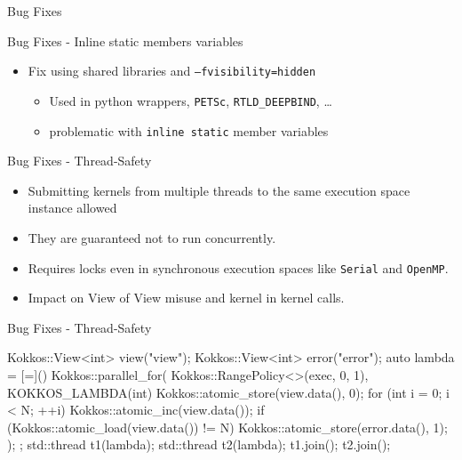 
\begin{frame}[fragile]

  {\Huge Bug Fixes}

    \vspace{10pt}

\end{frame}



\begin{frame}[fragile]{Bug Fixes - Inline static members variables}

\begin{itemize}
\item Fix using shared libraries and \texttt{--fvisibility=hidden}
  \begin{itemize}
  \item Used in python wrappers, \texttt{PETSc}, \texttt{RTLD\_DEEPBIND}, \dots
  \item problematic with \texttt{inline static} member variables
  \end{itemize}
\end{itemize}

\end{frame}

\begin{frame}[fragile]{Bug Fixes - Thread-Safety}
  \begin{itemize}
    \item Submitting kernels from multiple threads to the same execution space instance allowed
    \item They are guaranteed not to run concurrently. 
    \item Requires locks even in synchronous execution spaces like \texttt{Serial} and \texttt{OpenMP}.
    \item Impact on View of View misuse and kernel in kernel calls.
  \end{itemize}
\end{frame}

\begin{frame}[fragile]{Bug Fixes - Thread-Safety}
\begin{code}
  Kokkos::View<int> view("view");
  Kokkos::View<int> error("error");
  auto lambda = [=]() {
    Kokkos::parallel_for(
      Kokkos::RangePolicy<>(exec, 0, 1), KOKKOS_LAMBDA(int) {
          Kokkos::atomic_store(view.data(), 0);
          for (int i = 0; i < N; ++i) Kokkos::atomic_inc(view.data());
          if (Kokkos::atomic_load(view.data()) != N)
            Kokkos::atomic_store(error.data(), 1);
        });
  };
  std::thread t1(lambda);
  std::thread t2(lambda);
  t1.join();
  t2.join();
\end{code}
\end{frame}

